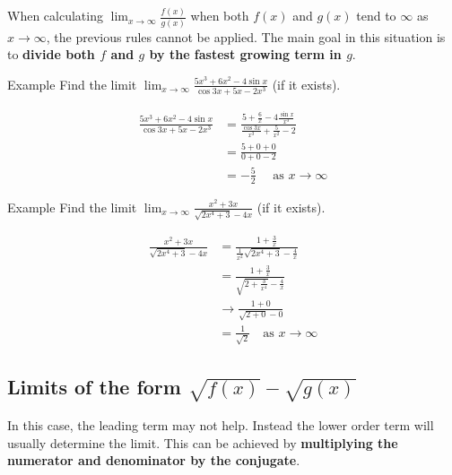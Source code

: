 \documentclass{report}
\begin{document}
	When calculating $\displaystyle\lim_{x\to\infty} \frac{f(x)}{g(x)}$ when both $f(x)$ and $g(x)$ tend to $\infty$ as $x \rightarrow \infty$, the previous rules cannot be applied. The main goal in this situation is to \textbf{divide both $f$ and $g$ by the fastest growing term in $g$}.

	\begin{question}{Example}
		Find the limit $\displaystyle\lim_{x\to\infty} \frac{5x^3 + 6x^2 - 4 \sin{x}}{\cos{3x} + 5x - 2x^3}$ (if it exists).

		\begin{align*}
			\frac{5x^3 + 6x^2 - 4 \sin{x}}{\cos{3x} + 5x - 2x^3} &= \frac{5 + \frac{6}{x} - 4 \frac{\sin{x}}{x^3}}{\frac{\cos{3x}}{x^3} + \frac{5}{x^2} - 2}	\\
																 &= \frac{5 + 0 + 0}{0 + 0 - 2}	\\
																 &= -\frac{5}{2} \quad \text{ as } x \rightarrow \infty
		\end{align*}
	\end{question}

	\begin{question}{Example}
		Find the limit $\displaystyle\lim_{x\to\infty} \frac{x^2 + 3x}{\sqrt{2x^4 + 3} - 4x}$ (if it exists).

		\begin{align*}
			\frac{x^2 + 3x}{\sqrt{2x^4 + 3} - 4x} &= \frac{1 + \frac{3}{x}}{\frac{1}{x^2}\sqrt{2x^4 + 3} - \frac{4}{x}}	\\
												  &= \frac{1 + \frac{3}{x}}{\sqrt{2 + \frac{3}{x^4}} - \frac{4}{x}}	\\
												  & \rightarrow \frac{1 + 0}{\sqrt{2 + 0} - 0}	\\
												  &= \frac{1}{\sqrt{2}} \quad \text{as } x \rightarrow \infty
		\end{align*}
	\end{question}

	\subsection{Limits of the form $\sqrt{f(x)} - \sqrt{g(x)}$}

		In this case, the leading term may not help. Instead the lower order term will usually determine the limit. This can be achieved by \textbf{multiplying the numerator and denominator by the conjugate}.
\end{document}
